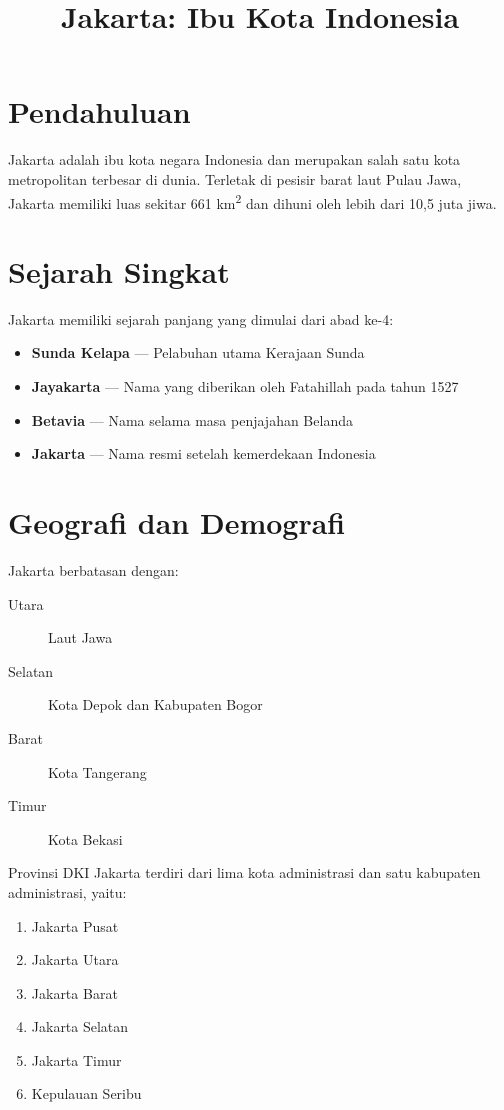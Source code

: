 \documentclass[a4paper,12pt]{article}
\title{\textbf{Jakarta: Ibu Kota Indonesia}}
\author{}
\date{}
\begin{document}
\maketitle
\thispagestyle{empty}

\section{Pendahuluan}

Jakarta adalah ibu kota negara Indonesia dan merupakan salah satu kota metropolitan terbesar di dunia. Terletak di pesisir barat laut Pulau Jawa, Jakarta memiliki luas sekitar 661 km\textsuperscript{2} dan dihuni oleh lebih dari 10,5 juta jiwa.

\section{Sejarah Singkat}

Jakarta memiliki sejarah panjang yang dimulai dari abad ke-4:
\begin{itemize}
    \item \textbf{Sunda Kelapa} --- Pelabuhan utama Kerajaan Sunda
    \item \textbf{Jayakarta} --- Nama yang diberikan oleh Fatahillah pada tahun 1527
    \item \textbf{Betavia} --- Nama selama masa penjajahan Belanda
    \item \textbf{Jakarta} --- Nama resmi setelah kemerdekaan Indonesia
\end{itemize}

\section{Geografi dan Demografi}

Jakarta berbatasan dengan:
\begin{description}
    \item[Utara] Laut Jawa
    \item[Selatan] Kota Depok dan Kabupaten Bogor
    \item[Barat] Kota Tangerang
    \item[Timur] Kota Bekasi
\end{description}

Provinsi DKI Jakarta terdiri dari lima kota administrasi dan satu kabupaten administrasi, yaitu:
\begin{enumerate}
    \item Jakarta Pusat
    \item Jakarta Utara
    \item Jakarta Barat
    \item Jakarta Selatan
    \item Jakarta Timur
    \item Kepulauan Seribu
\end{enumerate}
\end{document}
